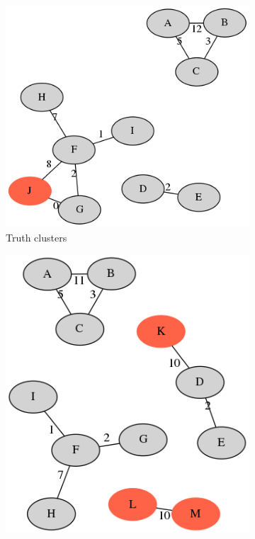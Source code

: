 \begin{figure}
     \centering
     \begin{subfigure}[b]{0.4\textwidth}
         \centering
         \includegraphics[width=\textwidth]{Chapter2/Figs/illumina-cluster-example.png}
         \caption{Truth clusters}
         \label{fig:example-truth}
     \end{subfigure}
     \hfill
     \begin{subfigure}[b]{0.4\textwidth}
         \centering
         \includegraphics[width=\textwidth]{Chapter2/Figs/ont-cluster-example.png}

\end{subfigure}
\end{figure}
